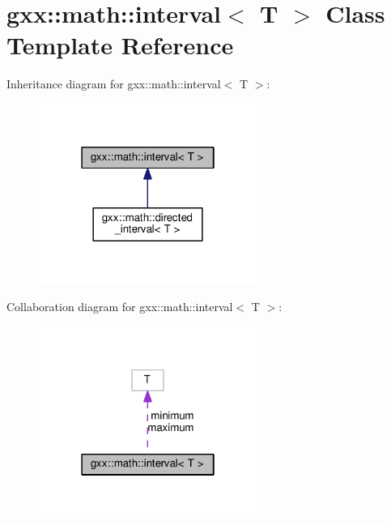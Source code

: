 \hypertarget{classgxx_1_1math_1_1interval}{}\section{gxx\+:\+:math\+:\+:interval$<$ T $>$ Class Template Reference}
\label{classgxx_1_1math_1_1interval}


Inheritance diagram for gxx\+:\+:math\+:\+:interval$<$ T $>$\+:
\nopagebreak
\begin{figure}[H]
\begin{center}
\leavevmode
\includegraphics[width=202pt]{classgxx_1_1math_1_1interval__inherit__graph}
\end{center}
\end{figure}


Collaboration diagram for gxx\+:\+:math\+:\+:interval$<$ T $>$\+:
\nopagebreak
\begin{figure}[H]
\begin{center}
\leavevmode
\includegraphics[width=202pt]{classgxx_1_1math_1_1interval__coll__graph}
\end{center}
\end{figure}
